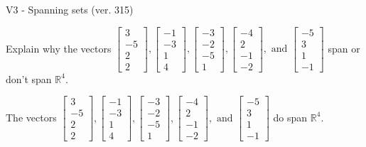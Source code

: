 \begin{exercise}
  \begin{exerciseTitle}V3 - Spanning sets (ver. 315)\end{exerciseTitle}
  \begin{exerciseStatement}
    Explain why the vectors \(\left[\begin{array}{r}
3 \\
-5 \\
2 \\
2
\end{array}\right] , \left[\begin{array}{r}
-1 \\
-3 \\
1 \\
4
\end{array}\right] , \left[\begin{array}{r}
-3 \\
-2 \\
-5 \\
1
\end{array}\right] , \left[\begin{array}{r}
-4 \\
2 \\
-1 \\
-2
\end{array}\right] , \text{ and } \left[\begin{array}{r}
-5 \\
3 \\
1 \\
-1
\end{array}\right]\) span or don't span \(\mathbb{R}^4\). 
	


  \end{exerciseStatement}
  \begin{exerciseAnswer}
   The vectors \(\left[\begin{array}{r}
3 \\
-5 \\
2 \\
2
\end{array}\right] , \left[\begin{array}{r}
-1 \\
-3 \\
1 \\
4
\end{array}\right] , \left[\begin{array}{r}
-3 \\
-2 \\
-5 \\
1
\end{array}\right] , \left[\begin{array}{r}
-4 \\
2 \\
-1 \\
-2
\end{array}\right] , \text{ and } \left[\begin{array}{r}
-5 \\
3 \\
1 \\
-1
\end{array}\right]\) 
  	 do  
	span \(\mathbb{R}^4\).
  



\end{exerciseAnswer}
\end{exercise}
